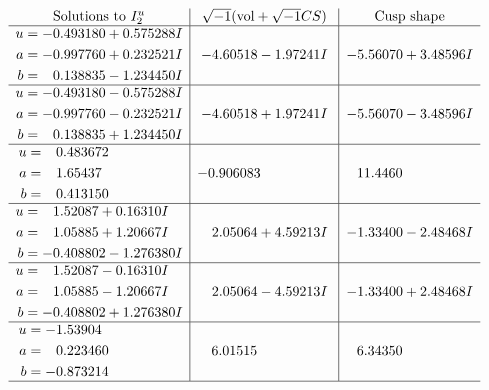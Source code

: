 \documentclass[1p]{elsarticle_modified}
\theoremstyle{definition}
\newcommand{\I}{\sqrt{-1}}
\begin{document}
$$\begin{array}{c|c|c}  
\text{Solutions to }I^u_{2}& \I (\text{vol} + \sqrt{-1}CS) & \text{Cusp shape}\\
 \hline 
\begin{aligned}
u &= -0.493180 + 0.575288 I \\
a &= -0.997760 + 0.232521 I \\
b &= \phantom{-}0.138835 - 1.234450 I\end{aligned}
 & -4.60518 - 1.97241 I & -5.56070 + 3.48596 I \\ \hline\begin{aligned}
u &= -0.493180 - 0.575288 I \\
a &= -0.997760 - 0.232521 I \\
b &= \phantom{-}0.138835 + 1.234450 I\end{aligned}
 & -4.60518 + 1.97241 I & -5.56070 - 3.48596 I \\ \hline\begin{aligned}
u &= \phantom{-}0.483672\phantom{ +0.000000I} \\
a &= \phantom{-}1.65437\phantom{ +0.000000I} \\
b &= \phantom{-}0.413150\phantom{ +0.000000I}\end{aligned}
 & -0.906083\phantom{ +0.000000I} & \phantom{-}11.4460\phantom{ +0.000000I} \\ \hline\begin{aligned}
u &= \phantom{-}1.52087 + 0.16310 I \\
a &= \phantom{-}1.05885 + 1.20667 I \\
b &= -0.408802 - 1.276380 I\end{aligned}
 & \phantom{-}2.05064 + 4.59213 I & -1.33400 - 2.48468 I \\ \hline\begin{aligned}
u &= \phantom{-}1.52087 - 0.16310 I \\
a &= \phantom{-}1.05885 - 1.20667 I \\
b &= -0.408802 + 1.276380 I\end{aligned}
 & \phantom{-}2.05064 - 4.59213 I & -1.33400 + 2.48468 I \\ \hline\begin{aligned}
u &= -1.53904\phantom{ +0.000000I} \\
a &= \phantom{-}0.223460\phantom{ +0.000000I} \\
b &= -0.873214\phantom{ +0.000000I}\end{aligned}
 & \phantom{-}6.01515\phantom{ +0.000000I} & \phantom{-}6.34350\phantom{ +0.000000I}\\
 \hline 
 \end{array}$$\newpage
\end{document}
